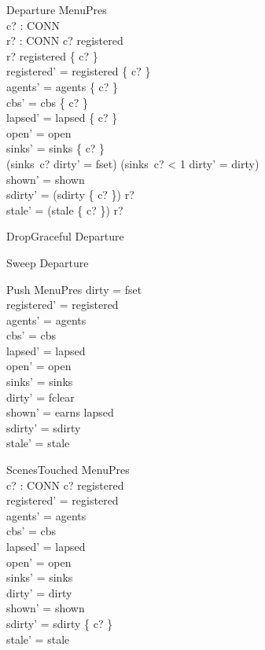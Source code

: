 \documentclass[a4paper,10pt,fleqn]{article}
\begin{document}
\begin{schema}{Departure}
  \Delta MenuPres \\
  c? : CONN \\
  r? : \power CONN
\where
  c? \in registered \\
  r? \subseteq registered \setminus \{ c? \} \\
  registered' = registered \setminus \{ c? \} \\
  agents' = agents \setminus \{ c? \} \\
  cbs' = cbs \setminus \{ c? \} \\
  lapsed' = lapsed \setminus \{ c? \} \\
  open' = open \\
  sinks' = sinks \oplus \{ c?  \} \\
  (sinks~c?  \land dirty' = fset) \lor
    (sinks~c? < 1 \land dirty' = dirty) \\
  shown' = shown \\
  sdirty' = (sdirty \setminus \{ c? \}) \cup r? \\
  stale' = (stale \setminus \{ c? \}) \cup r?
\end{schema}

\begin{zed}
  DropGraceful  Departure
\end{zed}

\begin{zed}
  Sweep  Departure 
\end{zed}

\begin{schema}{Push}
  \Delta MenuPres
\where
  dirty = fset \\
  registered' = registered \\
  agents' = agents \\
  cbs' = cbs \\
  lapsed' = lapsed \\
  open' = open \\
  sinks' = sinks \\
  dirty' = fclear \\
  shown' = earns \setminus lapsed \\
  sdirty' = sdirty \\
  stale' = stale
\end{schema}

\begin{schema}{ScenesTouched}
  \Delta MenuPres \\
  c? : CONN
\where
  c? \in registered \\
  registered' = registered \\
  agents' = agents \\
  cbs' = cbs \\
  lapsed' = lapsed \\
  open' = open \\
  sinks' = sinks \\
  dirty' = dirty \\
  shown' = shown \\
  sdirty' = sdirty \cup \{ c? \} \\
  stale' = stale
\end{schema}
\end{document}
